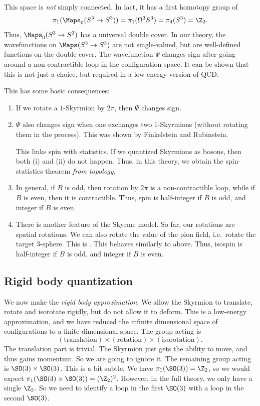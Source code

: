 \documentclass[a4paper]{article}
\begin{document}
This space is \emph{not} simply connected. In fact, it has a first homotopy group of
\[
  \pi_1(\Maps_0(S^3 \to S^3)) = \pi_1(\Omega^3 S^3) = \pi_4(S^3) = \Z_2.
\]
Thus, $\Maps_0(S^3 \to S^3)$ has a universal double cover. In our theory, the wavefunctions on $\Maps(S^3 \to S^3)$ are not single-valued, but are well-defined functions on the double cover. The wavefunction $\Psi$ changes sign after going around a non-contractible loop in the configuration space. It can be shown that this is not just a choice, but required in a low-energy version of QCD.

This has some basic consequences:
\begin{enumerate}
  \item If we rotate a $1$-Skyrmion by $2\pi$, then $\Psi$ changes sign.

  \item $\Psi$ also changes sign when one exchanges two 1-Skyrmions (without rotating them in the process). This was shown by Finkelstein and Rubinstein.

    This links spin with statistics. If we quantized Skyrmions as bosons, then both (i) and (ii) do not happen. Thus, in this theory, we obtain the spin-statistics theorem \emph{from topology}.
  \item In general, if $B$ is odd, then rotation by $2\pi$ is a non-contractible loop, while if $B$ is even, then it is contractible. Thus, spin is half-integer if $B$ is odd, and integer if $B$ is even.

  \item There is another feature of the Skyrme model. So far, our rotations are spatial rotations. We can also rotate the value of the pion field, i.e.\ rotate the target $3$-sphere. This is . This behaves similarly to above. Thus, isospin is half-integer if $B$ is odd, and integer if $B$ is even.
\end{enumerate}

\subsection{Rigid body quantization}
We now make the \emph{rigid body approximation}. We allow the Skyrmion to translate, rotate and isorotate rigidly, but do not allow it to deform. This is a low-energy approximation, and we have reduced the infinite dimensional space of configurations to a finite-dimensional space. The group acting is
\[
  (\mathrm{translation}) \times (\mathrm{rotation}) \times (\mathrm{isorotation}).
\]
The translation part is trivial. The Skyrmion just gets the ability to move, and thus gains momentum. So we are going to ignore it. The remaining group acting is $\SO(3) \times \SO(3)$. This is a bit subtle. We have $\pi_1(\SO(3)) = \Z_2$, so we would expect $\pi_1(\SO(3) \times \SO(3)) = (\Z_2)^2$. However, in the full theory, we only have a single $\Z_2$. So we need to identify a loop in the first $\SO(3)$ with a loop in the second $\SO(3)$.
\end{document}
